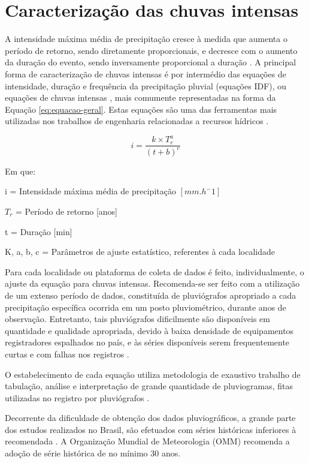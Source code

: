 \section{Caracterização das chuvas intensas}

A intensidade máxima média de precipitação cresce à medida que aumenta o período de retorno, sendo diretamente proporcionais, e decresce com o aumento da duração do evento, sendo inversamente proporcional a duração \cite{analise-chuva}. A principal forma de caracterização de chuvas intensas é por intermédio das equações de intensidade, duração e frequência da precipitação pluvial (equações IDF), ou equações de chuvas intensas \cite{tucci1993}, mais comumente representadas na forma da Equação \ref{eq:equacao-geral}. Estas equações são uma das ferramentas mais utilizadas nos trabalhos de engenharia relacionadas a recursos hídricos \cite{desagregacao}.

\begin{equation}
\label{eq:equacao-geral}
    i = \frac{k \times T_r^a}{(t+b)^c}
\end{equation}

Em que:

i = Intensidade máxima média de precipitação  $[mm.h^-1]$ 

$T_r$ = Período de retorno [anos]

t = Duração [min]

K, a, b, c = Parâmetros de ajuste estatístico, referentes à cada localidade

Para cada localidade ou plataforma de coleta de dados é feito, individualmente, o ajuste da equação para chuvas intensas. Recomenda-se ser feito com a utilização de um extenso período de dados, constituída de pluviógrafos \cite{interpolacao-chuva} apropriado a cada precipitação específica ocorrida em um posto pluviométrico, durante anos de observação. Entretanto, tais pluviógrafos dificilmente são disponíveis em quantidade e qualidade apropriada, devido à baixa densidade de equipamentos registradores espalhados no país, e às séries disponíveis serem frequentemente curtas e com falhas nos registros \cite{relacao-precipitacao}.

O estabelecimento de cada equação utiliza metodologia de exaustivo trabalho de tabulação, análise e interpretação de grande quantidade de pluviogramas, fitas utilizadas no registro por pluviógrafos \cite{relacao-precipitacao}. 

Decorrente da dificuldade de obtenção dos dados pluviográficos, a grande parte dos estudos realizados no Brasil, são efetuados com séries históricas inferiores à recomendada \cite{variabilidade-espacial}. A Organização Mundial de Meteorologia (OMM) recomenda a adoção de série histórica de no mínimo 30 anos.

